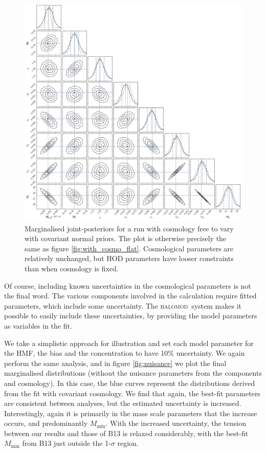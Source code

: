 \documentclass[5p]{elsarticle}
\newcommand{\halomod}{\textsc{halomod}}
\begin{document}
 \begin{figure}
\centering
\includegraphics[width=\linewidth]{figures/with_cosmo_cov_triangle.pdf} 
\caption[Marginalised joint-posteriors for a run with cosmology free to vary with covariant normal priors]{Marginalised joint-posteriors for a run with cosmology free to vary with covariant normal priors. The plot is otherwise precisely the same as figure \ref{fig:with_cosmo_flat}. Cosmological parameters are relatively unchanged, but HOD parameters have looser constraints than when cosmology is fixed.}
\label{fig:with_cosmo_cov}
\end{figure}

Of course, including known uncertainties in the cosmological parameters is not the final word. The various components involved in the calculation require fitted parameters, which include some uncertainty. The \halomod\  system makes it possible to easily include these uncertainties, by providing the model parameters as variables in the fit. 

We take a simplistic approach for illustration and set each model parameter for the HMF, the bias and the concentration to have 10\% uncertainty. We again perform the same analysis, and in figure \ref{fig:nuisance} we plot the final marginalised distributions (without the nuisance parameters from the components and cosmology). In this case, the blue curves represent the distributions derived from the fit with covariant cosmology. We find that again, the best-fit parameters are consistent between analyses, but the estimated uncertainty is increased. Interestingly, again it is primarily in the mass scale parameters that the increase occurs, and predominantly $M_\text{min}$. With the increased uncertainty, the tension between our results and those of B13 is relaxed considerably, with the best-fit $M_\text{min}$ from B13 just outside the 1-$\sigma$ region. 
\end{document}
